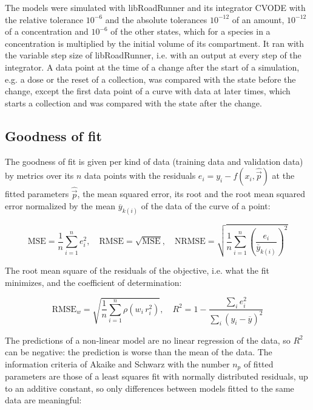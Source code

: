 The models were simulated with libRoadRunner \cite{Welsh2023} and its integrator CVODE \cite{Hindmarsh2005} with the relative tolerance $10^{-6}$ and the absolute tolerances $10^{-12}$ of an amount, $10^{-12}$ of a concentration and $10^{-6}$ of the other states, which for a species in a concentration is multiplied by the initial volume of its compartment. It ran with the variable step size of libRoadRunner, i.e. with an output at every step of the integrator. A data point at the time of a change after the start of a simulation, e.g. a dose or the reset of a collection, was compared with the state before the change, except the first data point of a curve with data at later times, which starts a collection and was compared with the state after the change.

\subsection{Goodness of fit}

The goodness of fit is given per kind of data (training data and validation data) by metrics over its $n$ data points with the residuals $e_i = y_i - f(x_i, \hat{\vec{p}})$ at the fitted parameters $\hat{\vec{p}}$, the mean squared error, its root and the root mean squared error normalized by the mean $\overline{y}_{k(i)}$ of the data of the curve of a point:

\begin{equation}
\mathrm{MSE} = \frac{1}{n} \sum_{i=1}^{n} e_i^2, \quad \mathrm{RMSE} = \sqrt{\mathrm{MSE}}, \quad \mathrm{NRMSE} = \sqrt{\frac{1}{n} \sum_{i=1}^{n} \left(\frac{e_i}{\overline{y}_{k(i)}}\right)^2}
\end{equation}

The root mean square of the residuals of the objective, i.e. what the fit minimizes, and the coefficient of determination:

\begin{equation}
\mathrm{RMSE}_w = \sqrt{\frac{1}{n} \sum_{i=1}^{n} \rho\left(w_i\, r_i^2\right)}, \quad R^2 = 1 - \frac{\sum_{i} e_i^2}{\sum_{i} \left(y_i - \overline{y}\right)^2}
\end{equation}

The predictions of a non-linear model are no linear regression of the data, so $R^2$ can be negative: the prediction is worse than the mean of the data. The information criteria of Akaike \cite{Akaike1974} and Schwarz \cite{Schwarz1978} with the number $n_p$ of fitted parameters are those of a least squares fit with normally distributed residuals, up to an additive constant, so only differences between models fitted to the same data are meaningful:

